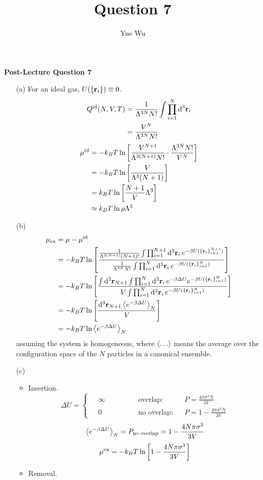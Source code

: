 \documentclass{article}
\title{Question 7}
\author{Yue Wu}
\begin{document}
    \begin{center}
        \LARGE\textbf{Post-Lecture Question 7}
    \end{center}

    \begin{enumerate}
        \item[(a)]
        For an ideal gas, $U(\{\vb{r}_i\})\equiv 0$.
        \begin{align*}
            Q^{\text{id}}(N,V,T)&=\frac{1}{\Lambda^{3N}N!}\int\prod_{i=1}^{N}\dd[3]{\vb{r}}_i\\
            &=\frac{V^N}{\Lambda^{3N}N!}
        \end{align*}
        \begin{align*}
            \mu^{\text{id}}&=-k_BT\ln\qty[\frac{V^{N+1}}{\Lambda^{3(N+1)}N!}\cdot\frac{\Lambda^{3N}N!}{V^N}]\\
            &=-k_BT\ln\qty[\frac{V}{\Lambda^3(N+1)}]\\
            &=k_BT\ln\qty[\frac{N+1}{V}\Lambda^3]\\
            &\approx k_BT\ln\rho\Lambda^3
        \end{align*}
        \item[(b)]
        \begin{align*}
            \mu_{\text{ex}}&=\mu-\mu^{\text{id}}\\
            &=-k_BT\ln\qty[\frac{\frac{1}{\Lambda^{3(N+1)}(N+1)!}\int\prod_{i=1}^{N+1}\dd[3]{\vb{r}}_ie^{-\beta U(\{\vb{r}_i\}_{i=1}^{N+1})}}{\frac{1}{\Lambda^{3N}N!}\int\prod_{i=1}^{N}\dd[3]{\vb{r}}_ie^{-\beta U(\{\vb{r}_i\}_{i=1}^{N})}}]\\
            &=-k_BT\ln\qty[\frac{\int\dd[3]{\vb{r}}_{N+1}\int\prod_{i=1}^{N}\dd[3]{\vb{r}}_i e^{-\beta\Delta U} e^{-\beta U(\{\vb{r}_i\}_{i=1}^{N})}}{V\int\prod_{i=1}^{N}\dd[3]{\vb{r}_i}e^{-\beta U(\{\vb{r}_i\}_{i=1}^{N})}}]\\
            &=-k_BT\ln\qty[\frac{\dd[3]{\vb{r}}_{N+1}\expval{e^{-\beta\Delta U}}_N}{V}]\\
            &=-k_BT\ln\expval{e^{-\beta\Delta U}}_N
        \end{align*}
        assuming the system is homogeneous, where $\expval{\dots}$ means the average over the configuration space of the $N$ particles in a canonical ensemble.
        \item[(c)]
        \begin{itemize}
            \item Insertion.
            $$\Delta U=\left\{\begin{aligned}
                &\;\infty && \quad\qquad \text{overlap}:&&P=\frac{4\pi\sigma^3N}{3V}\\
                &\;0 && \quad\qquad \text{no overlap}:&&P=1-\frac{4\pi\sigma^3N}{3V}
            \end{aligned}\right.$$
            $$\expval{e^{-\beta\Delta U}}_N=P_{\text{no overlap}}=1-\frac{4N\pi\sigma^3}{3V}$$
            $$\mu^{\text{ex}}=-k_BT\ln\qty[1-\frac{4N\pi\sigma^3}{3V}]$$
            \item Removal.
            

\end{itemize}
\end{enumerate}
\end{document}
